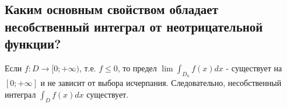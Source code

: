 
\subsection{Каким основным свойством обладает несобственный интеграл от неотрицательной функции?}

Если $f: D \rightarrow [0; +\infty)$, т.е. $f \leq 0$, то предел $\lim \int_{D_n} f(x) dx$ - существует на $[0; +\infty]$ и не зависит от выбора исчерпания. Следовательно, несобственный интеграл $\int_{D} f(x) dx$ существует.
